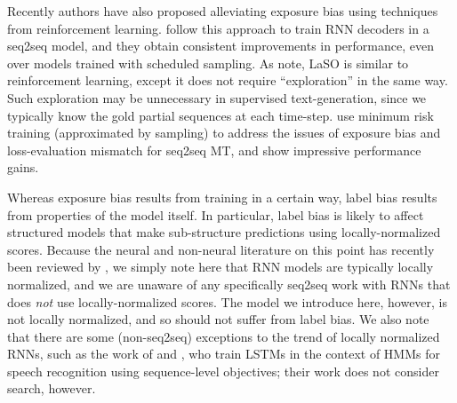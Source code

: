 Recently authors have also proposed alleviating exposure bias using
techniques from reinforcement learning. 
 follow this approach to train RNN decoders
in a seq2seq model, and they obtain consistent improvements in performance, even over models trained with scheduled sampling. As  note, LaSO is similar to reinforcement learning, except
it does not require ``exploration'' in the same
way. Such exploration may be unnecessary in supervised text-generation, since we typically know the
gold partial sequences at each time-step.  use minimum risk training (approximated by sampling) to address the issues of exposure bias and loss-evaluation mismatch for seq2seq MT, and show impressive performance gains.

Whereas exposure bias results from training in a certain way, label
bias results from properties of the model itself. In particular, label
bias is likely to affect structured models that make sub-structure
predictions using locally-normalized scores. Because the neural and
non-neural literature on this point has recently been reviewed by
, we simply note here that RNN
models are typically locally normalized, and we are unaware of any
specifically seq2seq work with RNNs that does \textit{not} use
locally-normalized scores. The model we introduce here, however, is
not locally normalized, and so should not suffer from label bias. We
also note that there are some (non-seq2seq) exceptions to the trend of
locally normalized RNNs, such as the work of 
and , who train LSTMs in the context
of HMMs for speech recognition using sequence-level objectives; their
work does not consider search, however.

%
